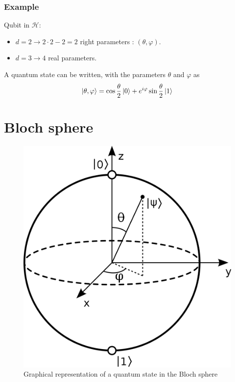 \documentclass{article}
\begin{document}
\subsubsection*{Example}
Qubit in $\mathscr{H}$:
\begin{itemize}[label=-]
    \item $d=2 \rightarrow 2\cdot2-2 = 2$ right parameters : $(\theta, \varphi)$.
    \item $d=3 \rightarrow 4$ real parameters.
\end{itemize}
A quantum state can be written, with the parameters $\theta$ and $\varphi$ as
\begin{equation}
    \ket{\theta, \varphi} = \cos \frac{\theta}{2}\ket{0} + e^{i\varphi}\sin \frac{\theta}{2}\ket{1}
\end{equation}

\section{Bloch sphere}
\begin{figure}[h]
    \centering
    \includegraphics[scale=0.15]{bloch-sphere.png}
    \caption{Graphical representation of a quantum state in the Bloch sphere}
\end{figure}
\end{document}
